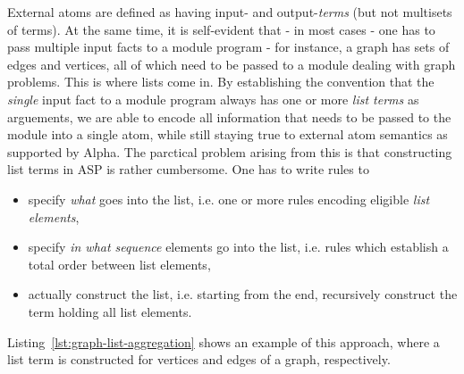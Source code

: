 External atoms are defined as having input- and output-\emph{terms} (but not multisets of terms). At the same time, it is self-evident that - in most cases - one has to pass multiple input facts to a module program - for instance, a graph has sets of edges and vertices, all of which need to be passed to a module dealing with graph problems. This is where lists come in. By establishing the convention that the \emph{single} input fact to a module program always has one or more \emph{list terms} as arguements, we are able to encode all information that needs to be passed to the module into a single atom, while still staying true to external atom semantics as supported by Alpha.
The parctical problem arising from this is that constructing list terms in ASP is rather cumbersome. One has to write rules to
\begin{itemize}
    \item specify \emph{what} goes into the list, i.e. one or more rules encoding eligible \emph{list elements},
    \item specify \emph{in what sequence} elements go into the list, i.e. rules which establish a total order between list elements,
    \item actually construct the list, i.e. starting from the end, recursively construct the term holding all list elements.
\end{itemize}
Listing~\ref{lst:graph-list-aggregation} shows an example of this approach, where a list term is constructed for vertices and edges of a graph, respectively.

